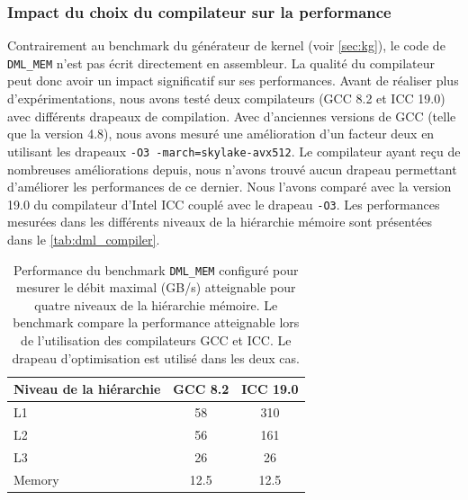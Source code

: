     \subsubsection{Impact du choix du compilateur sur la performance}
    
        Contrairement au benchmark du générateur de kernel (voir \autoref{sec:kg}), le code de \verb=DML_MEM= n'est pas écrit directement en assembleur. La qualité du compilateur peut donc avoir un impact significatif sur ses performances. Avant de réaliser plus d'expérimentations, nous avons testé deux compilateurs (GCC 8.2 et ICC 19.0) avec différents drapeaux de compilation. Avec d'anciennes versions de GCC (telle que la version 4.8), nous avons mesuré une amélioration d'un facteur deux en utilisant les drapeaux \verb|-O3 -march=skylake-avx512|. Le compilateur ayant reçu de nombreuses améliorations depuis, nous n'avons trouvé aucun drapeau permettant d'améliorer les performances de ce dernier. Nous l'avons comparé avec la version 19.0 du compilateur d'Intel ICC couplé avec le drapeau \verb|-O3|. Les performances mesurées dans les différents niveaux de la hiérarchie mémoire sont présentées dans le \autoref{tab:dml_compiler}.

        \begin{table}[ht!]
        \centering
        \begin{tabular}{|l|c|c|}
        \hline
        Niveau de la hiérarchie & GCC 8.2 & ICC 19.0 \\ \hline
        L1 & 58 & 310 \\ \hline
        L2 & 56 & 161 \\ \hline
        L3 & 26 & 26 \\ \hline
        Memory & 12.5 & 12.5 \\ \hline
        \end{tabular}%
        \caption{Performance du benchmark \texttt{DML\_MEM} configuré pour mesurer le débit maximal (GB/s) atteignable pour quatre niveaux de la hiérarchie mémoire. Le benchmark compare la performance atteignable lors de l'utilisation des compilateurs GCC et ICC. Le drapeau d'optimisation  est utilisé dans les deux cas.}
        \label{tab:dml_compiler}
        \end{table}

